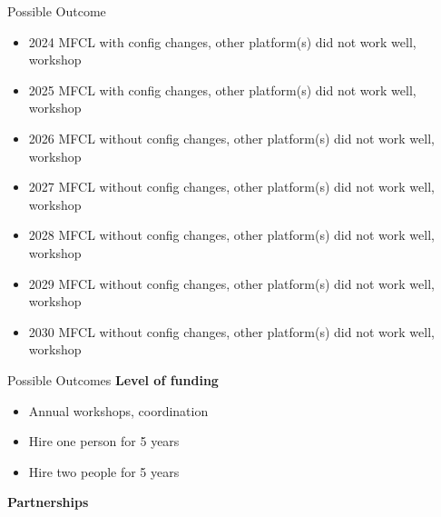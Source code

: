 \documentclass[aspectratio=169]{beamer}
\begin{document}

\begin{frame}[plain]
\end{frame}


\begin{frame}{Possible Outcome}\small
  \begin{itemize}
    \item[] 2024 MFCL with config changes, other platform(s) did not work well,
    workshop
    \item[] 2025 MFCL with config changes, other platform(s) did not work well,
    workshop
    \item[] 2026 MFCL without config changes, other platform(s) did not work
    well, workshop
    \item[] 2027 MFCL without config changes, other platform(s) did not work
    well, workshop
    \item[] 2028 MFCL without config changes, other platform(s) did not work
    well, workshop
    \item[] 2029 MFCL without config changes, other platform(s) did not work
    well, workshop
    \item[] 2030 MFCL without config changes, other platform(s) did not work
    well, workshop
  \end{itemize}
\end{frame}


\begin{frame}{Possible Outcomes}\small
  \textbf{Level of funding}
  \begin{itemize}
    \item[] Annual workshops, coordination\\[-1ex]
    \item[] Hire one person for 5 years\\[-1ex]
    \item[] Hire two people for 5 years\\[5ex]
  \end{itemize}
  \textbf{Partnerships}\\[2ex]
\end{frame}
\end{document}
